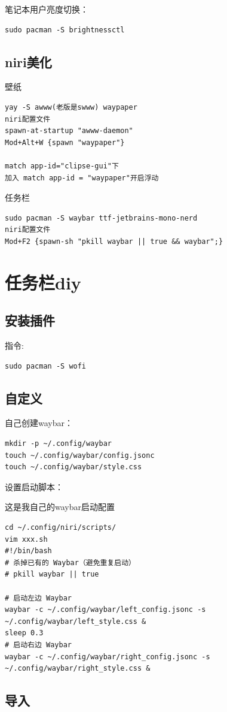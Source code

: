 \documentclass[a4paper, twocolumn, twoside, 10pt]{article}
\begin{document}
笔记本用户亮度切换：
\begin{lstlisting}
sudo pacman -S brightnessctl
\end{lstlisting}


\subsection{niri美化}

壁纸
\begin{lstlisting}
yay -S awww(老版是swww) waypaper
niri配置文件
spawn-at-startup "awww-daemon"
Mod+Alt+W {spawn "waypaper"}

match app-id="clipse-gui"下
加入 match app-id = "waypaper"开启浮动
\end{lstlisting}

任务栏
\begin{lstlisting}
sudo pacman -S waybar ttf-jetbrains-mono-nerd
niri配置文件
Mod+F2 {spawn-sh "pkill waybar || true && waybar";}
\end{lstlisting}

\section{任务栏diy}
\subsection{安装插件}

指令:
\begin{lstlisting}
sudo pacman -S wofi
\end{lstlisting}

\subsection{自定义}

自己创建waybar：
\begin{lstlisting}
mkdir -p ~/.config/waybar
touch ~/.config/waybar/config.jsonc
touch ~/.config/waybar/style.css
\end{lstlisting}

设置启动脚本：

这是我自己的waybar启动配置
\begin{lstlisting}
cd ~/.config/niri/scripts/
vim xxx.sh
#!/bin/bash
# 杀掉已有的 Waybar（避免重复启动）
# pkill waybar || true

# 启动左边 Waybar
waybar -c ~/.config/waybar/left_config.jsonc -s ~/.config/waybar/left_style.css &
sleep 0.3
# 启动右边 Waybar
waybar -c ~/.config/waybar/right_config.jsonc -s ~/.config/waybar/right_style.css &
\end{lstlisting}

\subsection{导入}
\end{document}
